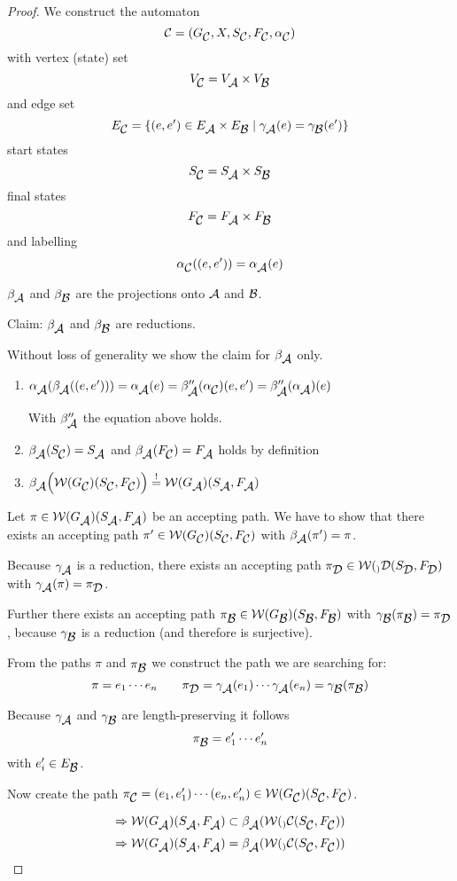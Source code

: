 \begin{proof}
We construct the automaton 
\[ \fa{C} = (G_{\fa{C}}, X, S_{\fa{C}}, F_{\fa{C}}, \alpha_{\fa{C}}) \]
with vertex (state) set
\[ V_{\fa{C}} = V_{\fa{A}} \times V_{\fa{B}} \]
and edge set
\[ E_{\fa{C}} = \{ (e, e') \in E_{\fa{A}} \times E_{\fa{B}} \mid
\gamma_{\fa{A}}(e) = \gamma_{\fa{B}}(e') \} \]
start states
\[ S_{\fa{C}} = S_{\fa{A}} \times S_{\fa{B}} \]
final states
\[ F_{\fa{C}} = F_{\fa{A}} \times F_{\fa{B}} \]
and labelling
\[ \alpha_{\fa{C}}((e, e')) = \alpha_{\fa{A}}(e) \] 

$\beta_{\fa{A}}$ and $\beta_{\fa{B}}$ are the projections onto $\fa{A}$ and
$\fa{B}$.

Claim: $\beta_{\fa{A}}$ and $\beta_{\fa{B}}$ are reductions.

Without loss of generality we show the claim for $\beta_{\fa{A}}$ only.

\begin{enumerate}
\item $\alpha_{\fa{A}}(\beta_{\fa{A}}((e,e'))) = \alpha_{\fa{A}}(e) =
\beta''_{\fa{A}}(\alpha_{\fa{C}})(e, e') = \beta''_{\fa{A}}(\alpha_{\fa{A}})(e)$

With $\beta''_{\fa{A}}$ the equation above holds.
\item $\beta_{\fa{A}}(S_{\fa{C}}) = S_{\fa{A}}$ and $\beta_{\fa{A}}(F_{\fa{C}})
= F_{\fa{A}}$ holds by definition
\item $\beta_{\fa{A}}\Big(\pathcat{G_{\fa{C}}}(S_{\fa{C}}, F_{\fa{C}})\Big)
\stackrel{!}{=} \pathcat{G_{\fa{A}}}(S_{\fa{A}}, F_{\fa{A}})$
\end{enumerate}

Let $\pi \in \pathcat{G_{\fa{A}}}(S_{\fa{A}}, F_{\fa{A}})$ be an accepting path.
We have to show that there exists an accepting path $\pi' \in
\pathcat{G_{\fa{C}}}(S_{\fa{C}}, F_{\fa{C}})$ with $\beta_{\fa{A}}(\pi') = \pi$.

Because $\gamma_{\fa{A}}$ is a reduction, there exists an accepting path
$\pi_{\fa{D}} \in \pathcat_{\fa{D}}(S_{\fa{D}}, F_{\fa{D}})$ with
$\gamma_{\fa{A}}(\pi) = \pi_{\fa{D}}$.

Further there exists an accepting path $\pi_{\fa{B}} \in
\pathcat{G_{\fa{B}}}(S_{\fa{B}}, F_{\fa{B}})$ with
$\gamma_{\fa{B}}(\pi_{\fa{B}}) = \pi_{\fa{D}}$, because $\gamma_{\fa{B}}$ is a
reduction (and therefore is surjective).

From the paths $\pi$ and $\pi_{\fa{B}}$ we construct the path we are searching
for:
\[ \pi = e_1 \cdots e_n \qquad \pi_{\fa{D}} = \gamma_{\fa{A}}(e_1) \cdots
\gamma_{\fa{A}}(e_n) = \gamma_{\fa{B}}(\pi_{\fa{B}}) \]

Because $\gamma_{\fa{A}}$ and $\gamma_{\fa{B}}$ are length-preserving it follows
\[ \pi_{\fa{B}} = e'_1 \cdots e'_n \]
with $e'_i \in E_{\fa{B}}$.

Now create the path $\pi_{\fa{C}} = (e_1, e'_1) \cdots (e_n, e'_n) \in
\pathcat{G_{\fa{C}}}(S_{\fa{C}}, F_{\fa{C}})$.

\[ \Rightarrow \pathcat{G_{\fa{A}}}(S_{\fa{A}}, F_{\fa{A}}) \subset
\beta_{\fa{A}}(\pathcat_{\fa{C}}(S_{\fa{C}}, F_{\fa{C}})) \]
\[ \Rightarrow \pathcat{G_{\fa{A}}}(S_{\fa{A}}, F_{\fa{A}}) =
\beta_{\fa{A}}(\pathcat_{\fa{C}}(S_{\fa{C}}, F_{\fa{C}})) \]
\end{proof}

